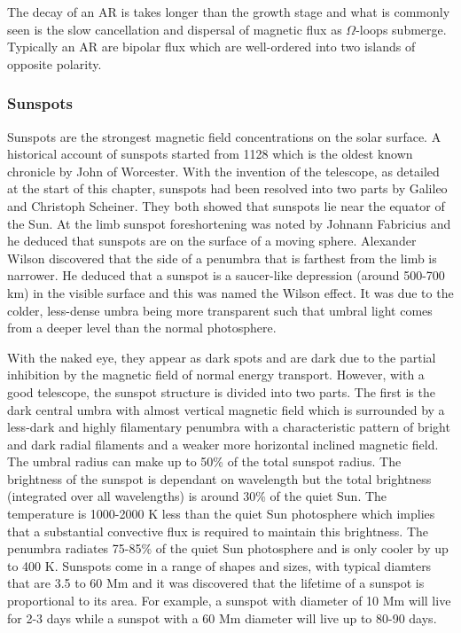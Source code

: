 	The decay of an AR is takes longer than the growth stage and what is commonly seen is the slow cancellation and dispersal of magnetic flux as $\Omega$-loops submerge.
	Typically an AR are bipolar flux which are well-ordered into two islands of opposite polarity.
		
\subsubsection{Sunspots}

    Sunspots are the strongest magnetic field concentrations on the solar surface.
    A historical account of sunspots started from 1128 which is the oldest known chronicle by John of Worcester.
    With the invention of the telescope, as detailed at the start of this chapter, sunspots had been resolved into two parts by Galileo and Christoph Scheiner.
    They both showed that sunspots lie near the equator of the Sun.
    At the limb sunspot foreshortening was noted by Johnann Fabricius and he deduced that sunspots are on the surface of a moving sphere. 
    Alexander Wilson discovered that the side of a penumbra that is farthest from the limb is narrower.
    He deduced that a sunspot is a saucer-like depression (around 500-700 km) in the visible surface and this was named the Wilson effect.
    It was due to the colder, less-dense umbra being more transparent such that umbral light comes from a deeper level than the normal photosphere.

	With the naked eye, they appear as dark spots and are dark due to the partial inhibition by the magnetic field  of normal energy transport.
	However, with a good telescope, the sunspot structure is divided into two parts.
	The first is the dark central umbra with almost vertical magnetic field which is surrounded by a less-dark and highly filamentary penumbra with a characteristic pattern of bright and dark radial filaments and a weaker more horizontal inclined magnetic field.
	The umbral radius can make up to 50\% of the total sunspot radius.
	The brightness of the sunspot is dependant on wavelength but the total brightness (integrated over all wavelengths) is around 30\% of the quiet Sun.
	The temperature is 1000-2000 K less than the quiet Sun photosphere which implies that a substantial convective flux is required to maintain this brightness.
	The penumbra radiates 75-85\% of the quiet Sun photosphere and is only cooler by up to 400 K.
	Sunspots come in a range of shapes and sizes, with typical diamters that are 3.5 to 60 Mm and it was discovered that the lifetime of a sunspot is proportional to its area. 
	For example, a sunspot with diameter of 10 Mm will live for 2-3 days while a sunspot with a 60 Mm diameter will live up to 80-90 days.
	
